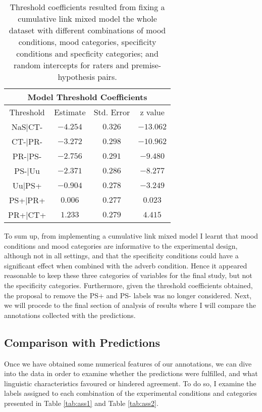 \begin{table}
\centering
\begin{tabular}{|c|c|c|c|}
\hline
\multicolumn{4}{|c|}{Model Threshold Coefficients}\\\hline
Threshold &  Estimate & Std. Error & z value\\\hline
NaS|CT- & $-4.254$ & $0.326$ & $-13.062$\\\hline
CT-|PR- & $-3.272$ & $0.298$ & $-10.962$\\\hline
PR-|PS- & $-2.756$ & $0.291$ & $ -9.480$\\\hline
PS-|Uu  & $-2.371$ & $0.286$ & $ -8.277$\\\hline
Uu|PS+  & $-0.904$ & $0.278$ & $ -3.249$\\\hline
PS+|PR+ & $ 0.006$ & $0.277$ & $  0.023$\\\hline
PR+|CT+ & $ 1.233$ & $0.279$ & $  4.415$\\\hline
\end{tabular}
\caption[Threshold coefficients.]{Threshold coefficients resulted from fixing a cumulative link mixed model the whole dataset with different combinations of mood conditions, mood categories, specificity conditions and specficity categories; and random intercepts for raters and premise-hypothesis pairs.}
\label{tab:modthres}
\end{table}

To sum up, from implementing a cumulative link mixed model I learnt that mood conditions and mood categories are informative to the experimental design, although not in all settings, and that the specificity conditions could have a significant effect when combined with the adverb condition. Hence it appeared reasonable to keep these three categories of variables for the final study, but not the specificity categories. Furthermore, given the threshold coefficients obtained, the proposal to remove the PS+ and PS- labels was no longer considered. Next, we will procede to the final section of analysis of results where I will compare the annotations collected with the predictions.\\

\subsection{Comparison with Predictions}
\label{subsec:pilcompred}
Once we have obtained some numerical features of our annotations, we can dive into the data in order to examine whether the predictions were fulfilled, and what linguistic characteristics favoured or hindered agreement. To do so, I examine the labels assigned to each combination of the experimental conditions and categories presented in Table \ref{tab:ass1} and Table \ref{tab:ass2}.\\


